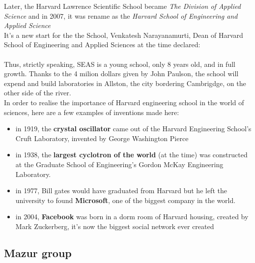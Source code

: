 \documentclass[10pt,a4paper]{article}
\begin{document}
Later, the Harvard Lawrence Scientific School became \textit{The Division of Applied Science} and in 2007, it was rename as the \textit{Harvard School of Engineering and Applied Science}\\
It's a new start for the the School, Venkatesh Narayanamurti, Dean of Harvard School of Engineering and Applied Sciences at the time declared:\\
\\

Thus, strictly speaking, SEAS is a young school, only 8 years old, and in full growth. Thanks to the 4 milion dollars given by John Paulson, the school will expend and build laboratories in Allston, the city bordering Cambrigdge, on the other side of the river.\\

In order to realise the importance of Harvard engineering school in the world of sciences, here are a few examples of inventions made here:
\begin{itemize}
\item in 1919, the \textbf{crystal oscillator} came out of the Harvard Engineering School’s Cruft Laboratory, invented by George Washington Pierce
\item in 1938, the \textbf{largest cyclotron of the world} (at the time) was constructed at the Graduate School of Engineering's Gordon McKay Engineering Laboratory.
\item in 1977, Bill gates would have graduated from Harvard but he left the university  to found \textbf{Microsoft}, one of the biggest company in the world.
\item in 2004, \textbf{Facebook} was born in a dorm room of Harvard housing, created by Mark Zuckerberg, it's now the biggest social network ever created
\end{itemize}

\subsection{Mazur group}
\end{document}
